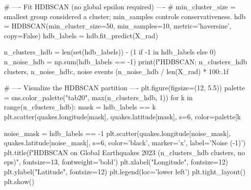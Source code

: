 \begin{codebox}[title={Fit HDBSCAN (no global epsilon required)}]
# ---- Fit HDBSCAN (no global epsilon required) ----
# min_cluster_size = smallest group considered a cluster; min_samples controls conservativeness.
hdb = HDBSCAN(min_cluster_size=50, min_samples=10, metric='haversine', copy=False)
hdb_labels = hdb.fit_predict(X_rad)

n_clusters_hdb = len(set(hdb_labels)) - (1 if -1 in hdb_labels else 0)
n_noise_hdb = np.sum(hdb_labels == -1)
print(f"HDBSCAN: {n_clusters_hdb} clusters, {n_noise_hdb:,} noise events ({n_noise_hdb / len(X_rad) * 100:.1f}%

# ---- Visualize the HDBSCAN partition ----
plt.figure(figsize=(12, 5.5))
palette = sns.color_palette("tab20", max(n_clusters_hdb, 1))
for k in range(n_clusters_hdb):
    mask = hdb_labels == k
    plt.scatter(quakes.longitude[mask], quakes.latitude[mask], s=6, color=palette[k %

noise_mask = hdb_labels == -1
plt.scatter(quakes.longitude[noise_mask], quakes.latitude[noise_mask], s=6, color='black', marker='x', label='Noise (-1)')
plt.title(f"HDBSCAN on Global Earthquakes 2023 ({n_clusters_hdb} clusters, no eps)", fontsize=13, fontweight='bold')
plt.xlabel("Longitude", fontsize=12)
plt.ylabel("Latitude", fontsize=12)
plt.legend(loc='lower left')
plt.tight_layout()
plt.show()
\end{codebox}

